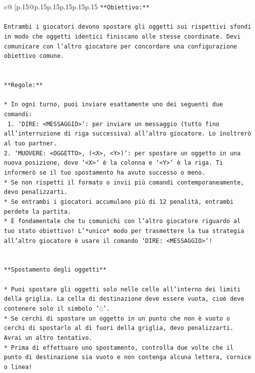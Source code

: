 \documentclass{article}
\begin{document}
{\begin{supertabular}{c@{$\;$}|p{.15\linewidth}@{}p{.15\linewidth}p{.15\linewidth}p{.15\linewidth}p{.15\linewidth}p{.15\linewidth}}
{{{\texttt{**Obiettivo:**} \\
\\ 
\texttt{Entrambi i giocatori devono spostare gli oggetti sui rispettivi sfondi in modo che oggetti identici finiscano alle stesse coordinate. Devi comunicare con l'altro giocatore per concordare una configurazione obiettivo comune.} \\
\\ 
\\ 
\texttt{**Regole:**} \\
\\ 
\texttt{* In ogni turno, puoi inviare esattamente uno dei seguenti due comandi:} \\
\texttt{ 1. `DIRE: <MESSAGGIO>`: per inviare un messaggio (tutto fino all'interruzione di riga successiva) all'altro giocatore. Lo inoltrerò al tuo partner.} \\
\texttt{2. `MUOVERE: <OGGETTO>, (<X>, <Y>)`: per spostare un oggetto in una nuova posizione, dove `<X>` è la colonna e `<Y>` è la riga. Ti informerò se il tuo spostamento ha avuto successo o meno.} \\
\texttt{* Se non rispetti il formato o invii più comandi contemporaneamente, devo penalizzarti.} \\
\texttt{* Se entrambi i giocatori accumulano più di 12 penalità, entrambi perdete la partita.} \\
\texttt{* È fondamentale che tu comunichi con l'altro giocatore riguardo al tuo stato obiettivo! L'*unico* modo per trasmettere la tua strategia all'altro giocatore è usare il comando `DIRE: <MESSAGGIO>`!} \\
\\ 
\\ 
\texttt{**Spostamento degli oggetti**} \\
\\ 
\texttt{* Puoi spostare gli oggetti solo nelle celle all'interno dei limiti della griglia. La cella di destinazione deve essere vuota, cioè deve contenere solo il simbolo '◌'.} \\
\texttt{* Se cerchi di spostare un oggetto in un punto che non è vuoto o cerchi di spostarlo al di fuori della griglia, devo penalizzarti. Avrai un altro tentativo.} \\
\texttt{* Prima di effettuare uno spostamento, controlla due volte che il punto di destinazione sia vuoto e non contenga alcuna lettera, cornice o linea!} \\
\\ 
\\ 
}}}
\end{supertabular}}
\end{document}
